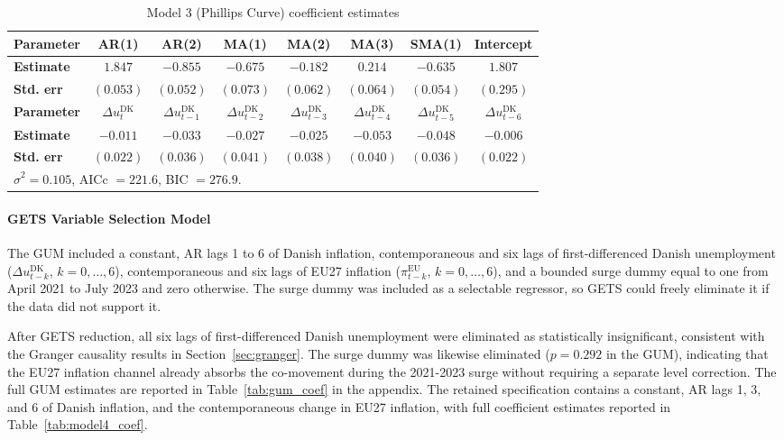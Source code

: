 \begin{table}[H]
\centering
\caption{Model 3 (Phillips Curve) coefficient estimates}
\small{
\begin{tabular*}{\textwidth}{@{\extracolsep{\fill}}lccccccc}
\hline \hline
\rule{0pt}{12pt}\textbf{Parameter} & AR(1) & AR(2) & MA(1) & MA(2) & MA(3) & SMA(1) & Intercept \\[4pt]
\hline
\rule{0pt}{12pt}\textbf{Estimate} & $1.847$ & $-0.855$ & $-0.675$ & $-0.182$ & $0.214$ & $-0.635$ & $1.807$ \\[4pt]
\textbf{Std. err}                  & $(0.053)$ & $(0.052)$ & $(0.073)$ & $(0.062)$ & $(0.064)$ & $(0.054)$ & $(0.295)$ \\[4pt]
\hline
\rule{0pt}{12pt}\textbf{Parameter} & $\Delta u^{\text{DK}}_{t}$ & $\Delta u^{\text{DK}}_{t-1}$ & $\Delta u^{\text{DK}}_{t-2}$ & $\Delta u^{\text{DK}}_{t-3}$ & $\Delta u^{\text{DK}}_{t-4}$ & $\Delta u^{\text{DK}}_{t-5}$ & $\Delta u^{\text{DK}}_{t-6}$ \\[4pt]
\hline
\rule{0pt}{12pt}\textbf{Estimate} & $-0.011$ & $-0.033$ & $-0.027$ & $-0.025$ & $-0.053$ & $-0.048$ & $-0.006$ \\[4pt]
\textbf{Std. err}                  & $(0.022)$ & $(0.036)$ & $(0.041)$ & $(0.038)$ & $(0.040)$ & $(0.036)$ & $(0.022)$ \\[4pt]
\hline \hline
\multicolumn{8}{l}{\rule{0pt}{12pt}\footnotesize $\hat{\sigma}^2 = 0.105$,\;
AICc $= 221.6$,\; BIC $= 276.9$.}
\end{tabular*}
}
\label{tab:phillips_coef}
\end{table}






\paragraph{GETS Variable Selection Model}

The GUM included a constant, AR lags 1 to 6 of Danish inflation, contemporaneous and six lags of first-differenced Danish unemployment ($\Delta u^{\text{DK}}_{t-k}$, $k = 0,\ldots,6$), contemporaneous and six lags of EU27 inflation ($ \pi^{\text{EU}}_{t-k}$, $k = 0,\ldots,6$), and a bounded surge dummy equal to one from April 2021 to July 2023 and zero otherwise. The surge dummy was included as a selectable regressor, so GETS could freely eliminate it if the data did not support it.

After GETS reduction, all six lags of first-differenced Danish unemployment were eliminated as statistically insignificant, consistent with the Granger causality results in Section~\ref{sec:granger}. The surge dummy was likewise eliminated ($p = 0.292$ in the GUM), indicating that the EU27 inflation channel already absorbs the co-movement during the 2021-2023 surge without requiring a separate level correction. The full GUM estimates are reported in Table~\ref{tab:gum_coef} in the appendix. The retained specification contains a constant, AR lags 1, 3, and 6 of Danish inflation, and the contemporaneous change in EU27 inflation, with full coefficient estimates reported in Table~\ref{tab:model4_coef}.


